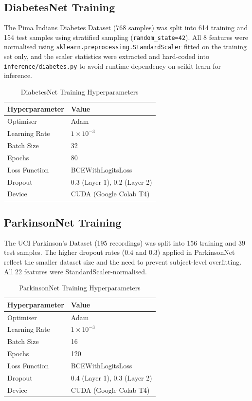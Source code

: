 \subsection{DiabetesNet Training}

The Pima Indians Diabetes Dataset (768 samples) was split into 614 training and 154 test samples using stratified sampling (\texttt{random\_state=42}). All 8 features were normalised using \texttt{sklearn.preprocessing.StandardScaler} fitted on the training set only, and the scaler statistics were extracted and hard-coded into \texttt{inference/diabetes.py} to avoid runtime dependency on scikit-learn for inference.

\begin{table}[h!]
\centering
\caption{DiabetesNet Training Hyperparameters}
\renewcommand{\arraystretch}{1.3}
\begin{tabular}{|l|l|}
\hline
\textbf{Hyperparameter} & \textbf{Value} \\
\hline
Optimiser & Adam \\
Learning Rate & $1 \times 10^{-3}$ \\
Batch Size & 32 \\
Epochs & 80 \\
Loss Function & BCEWithLogitsLoss \\
Dropout & 0.3 (Layer 1), 0.2 (Layer 2) \\
Device & CUDA (Google Colab T4) \\
\hline
\end{tabular}
\end{table}



\subsection{ParkinsonNet Training}

The UCI Parkinson's Dataset (195 recordings) was split into 156 training and 39 test samples. The higher dropout rates (0.4 and 0.3) applied in ParkinsonNet reflect the smaller dataset size and the need to prevent subject-level overfitting. All 22 features were StandardScaler-normalised.

\begin{table}[h!]
\centering
\caption{ParkinsonNet Training Hyperparameters}
\renewcommand{\arraystretch}{1.3}
\begin{tabular}{|l|l|}
\hline
\textbf{Hyperparameter} & \textbf{Value} \\
\hline
Optimiser & Adam \\
Learning Rate & $1 \times 10^{-3}$ \\
Batch Size & 16 \\
Epochs & 120 \\
Loss Function & BCEWithLogitsLoss \\
Dropout & 0.4 (Layer 1), 0.3 (Layer 2) \\
Device & CUDA (Google Colab T4) \\
\hline
\end{tabular}
\end{table}



